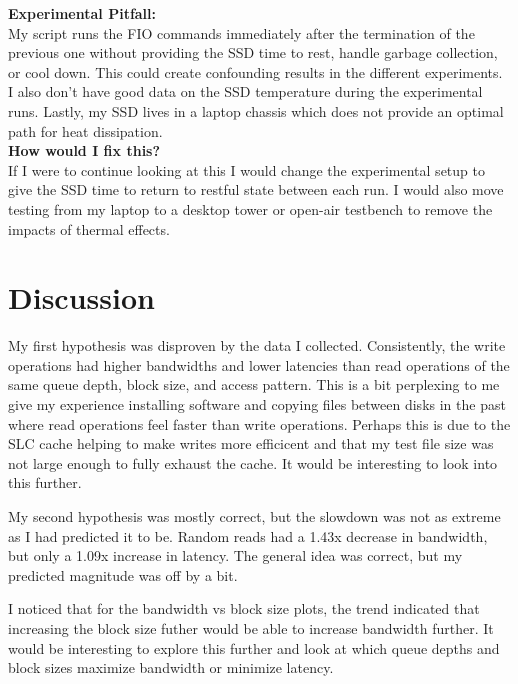 \documentclass[11pt]{article}
\begin{document}
\begin{failurebox}
	\textbf{Experimental Pitfall:} \\

	My script runs the FIO commands immediately after the termination of the previous one without providing the SSD time to
	rest, handle garbage collection, or cool down. This could create confounding results in the different experiments. I
	also don't have good data on the SSD temperature during the experimental runs. Lastly, my SSD lives in a laptop chassis
	which does not provide an optimal path for heat dissipation. \\

	\textbf{How would I fix this?} \\

	If I were to continue looking at this I would change the experimental setup to give the SSD time to return to restful
	state between each run. I would also move testing from my laptop to a desktop tower or open-air testbench to remove the
	impacts of thermal effects.

\end{failurebox}

\section{Discussion}

My first hypothesis was disproven by the data I collected. Consistently, the write operations had higher bandwidths and
lower latencies than read operations of the same queue depth, block size, and access pattern. This is a bit perplexing
to me give my experience installing software and copying files between disks in the past where read operations feel
faster than write operations. Perhaps this is due to the SLC cache helping to make writes more efficicent and that my
test file size was not large enough to fully exhaust the cache. It would be interesting to look into this further.

My second hypothesis was mostly correct, but the slowdown was not as extreme as I had predicted it to be. Random reads
had a 1.43x decrease in bandwidth, but only a 1.09x increase in latency. The general idea was correct, but my predicted
magnitude was off by a bit.

I noticed that for the bandwidth vs block size plots, the trend indicated that increasing the block size futher would
be able to increase bandwidth further. It would be interesting to explore this further and look at which queue depths
and block sizes maximize bandwidth or minimize latency.
\end{document}
